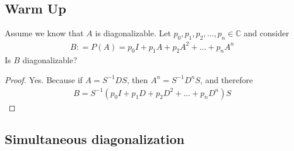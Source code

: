 

\subsection*{Warm Up}
Assume we know that $A$ is diagonalizable. Let $p_0, p_1 , p_2 ,
\ldots , p_n \in \mathbb{C}$ and consider
\begin{align*}
  B: = P(A) = p_0 I + p_1 A + p_2A^2 + \ldots + p_nA^n
\end{align*}
Is $B$ diagonalizable?
\begin{proof}
  Yes. Because if $A = S^{-1}DS$, then $A^n = S^{-1}D^n S$, and therefore
  \begin{align*}
    B = S^{-1} (p_0 I  + p_1D + p_2D^2 + \ldots + p_nD^n)S
  \end{align*}
\end{proof}

\subsection{Simultaneous diagonalization}

